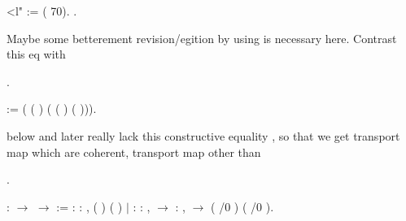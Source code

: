\coqdocemptyline
\begin{coqdoccode}
\coqdocemptyline
\coqdocnoindent
{} <l" :=  (  70).\coqdoceol
\coqdocnoindent
{} .\coqdoceol
\coqdocemptyline
\end{coqdoccode}
Maybe some betterement revision/egition by using  is necessary here.
 Contrast this eq with  \begin{coqdoccode}
\coqdocnoindent
{} .\coqdoceol
\end{coqdoccode}
\coqdoceol
\coqdocemptyline
\coqdocnoindent
{}    :=\coqdoceol
\coqdocindent{1.00em}
( (  ) ( (  ) (  ))).

\coqdocemptyline


  below and later really lack this constructive equality ,
so that we get transport map which are coherent, transport map other than  \begin{coqdoccode}
\coqdocnoindent
{} .\coqdoceol
\end{coqdoccode}
\coqdoceol
\coqdocemptyline
\coqdocnoindent
{}  :  \ensuremath{\rightarrow}  \ensuremath{\rightarrow}  :=\coqdoceol
\coqdocindent{2.00em}
 : \coqdockw{\ensuremath{\forall}}  : ,\coqdoceol
\coqdocindent{12.50em}
 ( ) ( )\coqdoceol
\coqdocindent{1.00em}
\ensuremath{|}  : \coqdockw{\ensuremath{\forall}}   : ,\coqdoceol
\coqdocindent{12.50em}
   \ensuremath{\rightarrow}\coqdoceol
\coqdocindent{12.50em}
\coqdockw{\ensuremath{\forall}}   : ,\coqdoceol
\coqdocindent{12.50em}
   \ensuremath{\rightarrow}\coqdoceol
\coqdocindent{12.50em}
 ( /0 ) ( /0 ).

